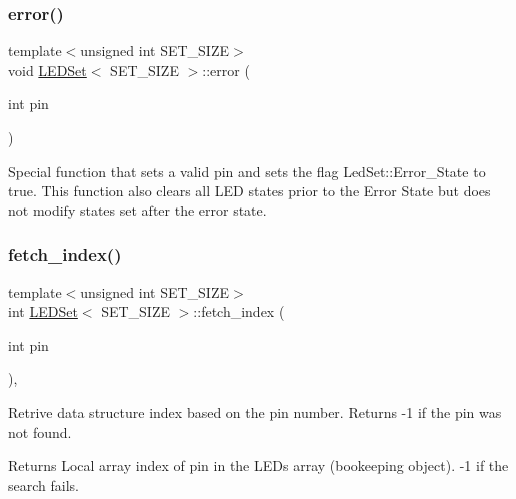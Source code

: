 \subsubsection{\texorpdfstring{error()}{error()}}
{\footnotesize\ttfamily template$<$unsigned int S\+E\+T\+\_\+\+S\+I\+ZE$>$ \\
void \hyperlink{classLEDSet}{L\+E\+D\+Set}$<$ S\+E\+T\+\_\+\+S\+I\+ZE $>$\+::error (\begin{DoxyParamCaption}\item[{int}]{pin }\end{DoxyParamCaption})\hspace{0.3cm}{\ttfamily [inline]}}



Special function that sets a valid pin and sets the flag {\ttfamily Led\+Set\+::\+Error\+\_\+\+State} to true. This function also clears all L\+ED states prior to the Error State but does not modify states set after the error state. 

\mbox{\label{classLEDSet_a4ffb3b4a8a5cffdc03f4040ff67a33e9}} 
\subsubsection{\texorpdfstring{fetch\+\_\+index()}{fetch\_index()}}
{\footnotesize\ttfamily template$<$unsigned int S\+E\+T\+\_\+\+S\+I\+ZE$>$ \\
int \hyperlink{classLEDSet}{L\+E\+D\+Set}$<$ S\+E\+T\+\_\+\+S\+I\+ZE $>$\+::fetch\+\_\+index (\begin{DoxyParamCaption}\item[{int}]{pin }\end{DoxyParamCaption})\hspace{0.3cm}{\ttfamily [inline]}, {\ttfamily [private]}}



Retrive data structure index based on the pin number. Returns -\/1 if the pin was not found. 

\begin{DoxyReturn}{Returns}
Local array index of pin in the L\+E\+Ds array (bookeeping object). -\/1 if the search fails. 
\end{DoxyReturn}
\mbox{\label{classLEDSet_aae4545d8f8cb6e41a3c2960fb7369e48}} 
